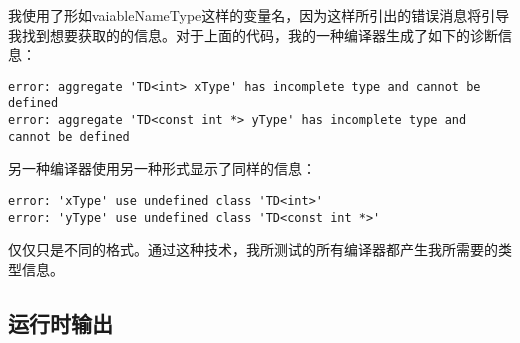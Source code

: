 我使用了形如vaiableNameType这样的变量名，因为这样所引出的错误消息将引导我找到想要获取的的信息。对于上面的代码，我的一种编译器生成了如下的诊断信息：

\begin{lstlisting}
error: aggregate 'TD<int> xType' has incomplete type and cannot be defined
error: aggregate 'TD<const int *> yType' has incomplete type and cannot be defined
\end{lstlisting}

另一种编译器使用另一种形式显示了同样的信息：

\begin{lstlisting}
error: 'xType' use undefined class 'TD<int>'
error: 'yType' use undefined class 'TD<const int *>'
\end{lstlisting}

仅仅只是不同的格式。通过这种技术，我所测试的所有编译器都产生我所需要的类型信息。

\subsection{运行时输出}
































